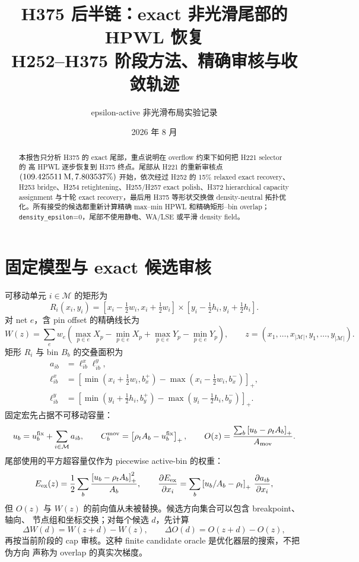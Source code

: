 \documentclass[UTF8,11pt,a4paper]{ctexart}
\title{H375 后半链：exact 非光滑尾部的 HPWL 恢复\\
\large H252--H375 阶段方法、精确审核与收敛轨迹}
\author{epsilon-active 非光滑布局实验记录}
\date{2026 年 8 月}
\newcommand{\mov}{\mathcal{M}}
\newcommand{\clip}[1]{\left[#1\right]_+}
\begin{document}
\maketitle

\begin{abstract}
本报告只分析 H375 的 exact 尾部，重点说明在 overflow 约束下如何把 H221 selector 的
高 HPWL 逐步恢复到 H375 终点。尾部从 H221 的重新审核点
$(109.425511\,{\rm M},7.803537\%)$ 开始，依次经过 H252 的 15\% relaxed exact
recovery、H253 bridge、H254 retightening、H255/H257 exact polish、H372 hierarchical
capacity assignment 与十轮 exact recovery，最后用 H375 等形状交换做 density-neutral
拓扑优化。所有接受的候选都重新计算精确 max--min HPWL 和精确矩形--bin overlap；
\texttt{density\_epsilon}=0，尾部不使用静电、WA/LSE 或平滑 density field。
\end{abstract}

\section{固定模型与 exact 候选审核}

可移动单元 $i\in\mov$ 的矩形为
\[
 R_i(x_i,y_i)=[x_i-\tfrac12w_i,x_i+\tfrac12w_i]
             \times[y_i-\tfrac12h_i,y_i+\tfrac12h_i].
\]
对 net $e$，含 pin offset 的精确线长为
\begin{equation}
 W(z)=\sum_e w_e\left(\max_{p\in e}X_p-\min_{p\in e}X_p
                       +\max_{p\in e}Y_p-\min_{p\in e}Y_p\right),
 \qquad z=(x_1,\ldots,x_{|\mov|},y_1,\ldots,y_{|\mov|}).
 \label{eq:hpwl}
\end{equation}
矩形 $R_i$ 与 bin $B_b$ 的交叠面积为
\begin{align}
 a_{ib}&=\ell^x_{ib}\ell^y_{ib},\\
 \ell^x_{ib}&=\clip{\min(x_i+\tfrac12w_i,b_x^+)-\max(x_i-\tfrac12w_i,b_x^-)},\\
 \ell^y_{ib}&=\clip{\min(y_i+\tfrac12h_i,b_y^+)-\max(y_i-\tfrac12h_i,b_y^-)}.
 \label{eq:area}
\end{align}
固定宏先占据不可移动容量：
\begin{equation}
 u_b=u_b^{\rm fix}+\sum_{i\in\mov}a_{ib},\qquad
 C_b^{\rm mov}=\clip{\rho_tA_b-u_b^{\rm fix}},\qquad
 O(z)=\frac{\sum_b\clip{u_b-\rho_tA_b}}{A_{\rm mov}}.
 \label{eq:exactoverflow}
\end{equation}
尾部使用的平方超容量仅作为 piecewise active-bin 的权重：
\begin{equation}
 E_{\rm ex}(z)=\frac12\sum_b\frac{\clip{u_b-\rho_tA_b}^{2}}{A_b},\qquad
 \frac{\partial E_{\rm ex}}{\partial x_i}
 =\sum_b\clip{u_b/A_b-\rho_t}\,\frac{\partial a_{ib}}{\partial x_i},
 \label{eq:excess}
\end{equation}
但 $O(z)$ 与 $W(z)$ 的前向值从未被替换。候选方向集合可以包含 breakpoint、轴向、
节点组和坐标交换；对每个候选 $d$，先计算
\begin{equation}
 \Delta W(d)=W(z+d)-W(z),\qquad \Delta O(d)=O(z+d)-O(z),
 \label{eq:delta}
\end{equation}
再按当前阶段的 cap 审核。这种 finite candidate oracle 是优化器层的搜索，不把伪方向
声称为 overlap 的真实次梯度。
\end{document}
